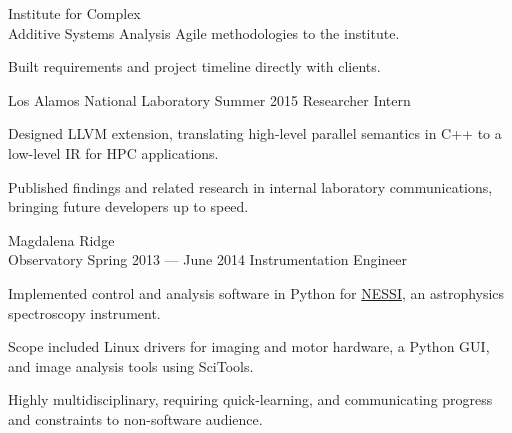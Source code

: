 \documentclass{tc_cv}
\newcommand{\jobSpace}{\vspace{0.75em}}
\begin{document}
\begin{minipage}[t]{0.6\linewidth}
\begin{job}{Institute for Complex \\ Additive Systems Analysis}
      Agile methodologies to the institute.
    \item Built requirements and project timeline directly with clients.
  \end{job}
  \jobSpace
  \begin{job}{Los Alamos National Laboratory}
    {Summer 2015}
    {Researcher Intern}
    \item Designed LLVM extension, translating high-level parallel semantics
      in C++ to a low-level IR for HPC applications.
    \item Published findings and related research in internal laboratory
      communications, bringing future developers up to speed.
  \end{job}
  \jobSpace
  \begin{job}{Magdalena Ridge \\ Observatory}
    {Spring 2013 --- June 2014}
    {Instrumentation Engineer}
    \item Implemented control and analysis software in Python for
      \href{https://noirlab.edu/public/programs/kitt-peak-national-observatory/wiyn-35m-telescope/nessi/}{NESSI},
      an astrophysics spectroscopy instrument.
    \item Scope included Linux drivers for imaging and motor hardware, a Python
      GUI, and image analysis tools using SciTools.
    \item Highly multidisciplinary, requiring quick-learning, and communicating
      progress and constraints to non-software audience.
  \end{job}
\end{minipage}
\end{document}
